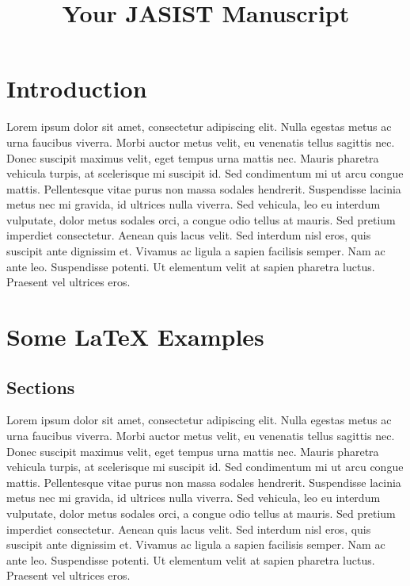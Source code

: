 \documentclass[a4paper,man,natbib,12pt]{apa6}
\title{Your JASIST Manuscript}
\begin{document}
\maketitle

\section{Introduction}

Lorem ipsum dolor sit amet, consectetur adipiscing elit. Nulla egestas metus ac urna faucibus viverra. Morbi auctor metus velit, eu venenatis tellus sagittis nec. Donec suscipit maximus velit, eget tempus urna mattis nec. Mauris pharetra vehicula turpis, at scelerisque mi suscipit id. Sed condimentum mi ut arcu congue mattis. Pellentesque vitae purus non massa sodales hendrerit. Suspendisse lacinia metus nec mi gravida, id ultrices nulla viverra. Sed vehicula, leo eu interdum vulputate, dolor metus sodales orci, a congue odio tellus at mauris. Sed pretium imperdiet consectetur. Aenean quis lacus velit. Sed interdum nisl eros, quis suscipit ante dignissim et. Vivamus ac ligula a sapien facilisis semper. Nam ac ante leo. Suspendisse potenti. Ut elementum velit at sapien pharetra luctus. Praesent vel ultrices eros.

\section{Some \LaTeX{} Examples}

\subsection{Sections}

Lorem ipsum dolor sit amet, consectetur adipiscing elit. Nulla egestas metus ac urna faucibus viverra. Morbi auctor metus velit, eu venenatis tellus sagittis nec. Donec suscipit maximus velit, eget tempus urna mattis nec. Mauris pharetra vehicula turpis, at scelerisque mi suscipit id. Sed condimentum mi ut arcu congue mattis. Pellentesque vitae purus non massa sodales hendrerit. Suspendisse lacinia metus nec mi gravida, id ultrices nulla viverra. Sed vehicula, leo eu interdum vulputate, dolor metus sodales orci, a congue odio tellus at mauris. Sed pretium imperdiet consectetur. Aenean quis lacus velit. Sed interdum nisl eros, quis suscipit ante dignissim et. Vivamus ac ligula a sapien facilisis semper. Nam ac ante leo. Suspendisse potenti. Ut elementum velit at sapien pharetra luctus. Praesent vel ultrices eros.
\end{document}
